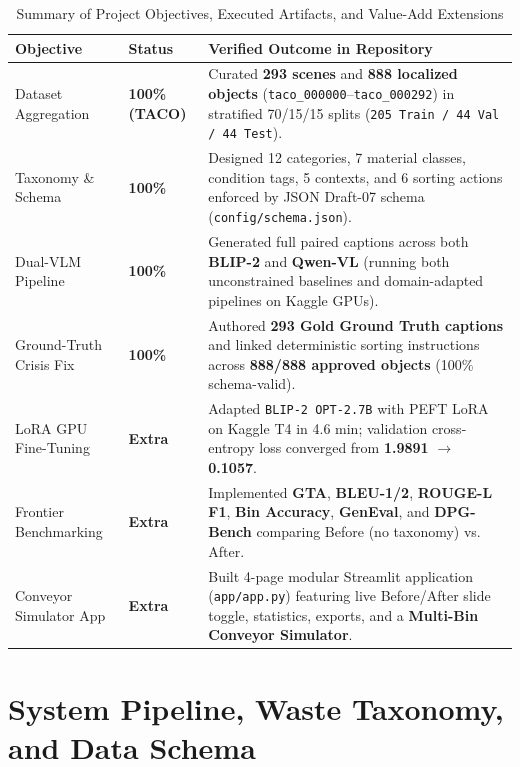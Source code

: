 \documentclass[11pt,a4paper]{article}
\begin{document}
\begin{table}[H]
\centering
\caption{Summary of Project Objectives, Executed Artifacts, and Value-Add Extensions}
\label{tab:objectives}
\begin{tabularx}{\textwidth}{@{}p{} p{} X@{}}
\toprule
\textbf{Objective} & \textbf{Status} & \textbf{Verified Outcome in Repository} \\
\midrule
Dataset Aggregation & \textbf{100\% (TACO)} & Curated \textbf{293 scenes} and \textbf{888 localized objects} (\texttt{taco\_000000}--\texttt{taco\_000292}) in stratified 70/15/15 splits (\texttt{205 Train / 44 Val / 44 Test}). \\
Taxonomy \& Schema & \textbf{100\%} & Designed 12 categories, 7 material classes, condition tags, 5 contexts, and 6 sorting actions enforced by JSON Draft-07 schema (\texttt{config/schema.json}). \\
Dual-VLM Pipeline & \textbf{100\%} & Generated full paired captions across both \textbf{BLIP-2} and \textbf{Qwen-VL} (running both unconstrained baselines and domain-adapted pipelines on Kaggle GPUs). \\
Ground-Truth Crisis Fix & \textbf{100\%} & Authored \textbf{293 Gold Ground Truth captions} and linked deterministic sorting instructions across \textbf{888/888 approved objects} (100\% schema-valid). \\
LoRA GPU Fine-Tuning & \textbf{Extra} & Adapted \texttt{BLIP-2 OPT-2.7B} with PEFT LoRA on Kaggle T4 in 4.6 min; validation cross-entropy loss converged from \textbf{1.9891} $\to$ \textbf{0.1057}. \\
Frontier Benchmarking & \textbf{Extra} & Implemented \textbf{GTA}, \textbf{BLEU-1/2}, \textbf{ROUGE-L F1}, \textbf{Bin Accuracy}, \textbf{GenEval}, and \textbf{DPG-Bench} comparing Before (no taxonomy) vs. After. \\
Conveyor Simulator App & \textbf{Extra} & Built 4-page modular Streamlit application (\texttt{app/app.py}) featuring live Before/After slide toggle, statistics, exports, and a \textbf{Multi-Bin Conveyor Simulator}. \\
\bottomrule
\end{tabularx}
\end{table}

\section{System Pipeline, Waste Taxonomy, and Data Schema}
\end{document}
